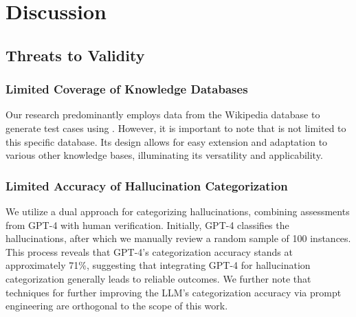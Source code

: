 \section{Discussion}
\subsection{Threats to Validity}

\subsubsection*{\textbf{Limited Coverage of Knowledge Databases}}

Our research predominantly employs data from the Wikipedia database to generate test cases using \tool. However, it is important to note that \tool is not limited to this specific database. Its design allows for easy extension and adaptation to various other knowledge bases, illuminating its versatility and applicability.

\subsubsection*{\textbf{Limited Accuracy of Hallucination Categorization}}
We utilize a dual approach for categorizing hallucinations, combining assessments from GPT-4 with human verification. Initially, GPT-4 classifies the hallucinations, after which we manually review a random sample of 100 instances. This process reveals that GPT-4's categorization accuracy stands at approximately 71\%, suggesting that integrating GPT-4 for hallucination categorization generally leads to reliable outcomes. We further note that techniques for further improving the LLM's categorization accuracy via prompt engineering are orthogonal to the scope of this work.

